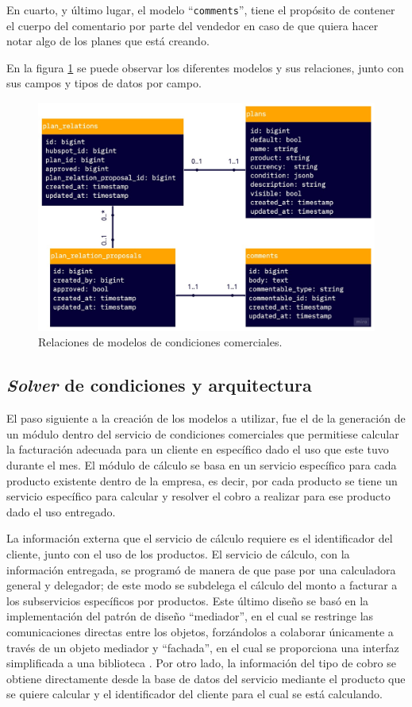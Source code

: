     En cuarto, y último lugar, el modelo ``\texttt{comments}'', tiene el propósito de contener el cuerpo del comentario por parte del vendedor en caso de que quiera hacer notar algo de los planes que está creando.

    En la figura \ref{fig:cc_relations} se puede observar los diferentes modelos y sus relaciones, junto con sus campos y tipos de datos por campo.
    
    \begin{figure}
      \centering
      \includegraphics[width=0.75\linewidth]{figures/cc/cc_relations.jpg}
      \caption{Relaciones de modelos de condiciones comerciales.}
      \label{fig:cc_relations}
    \end{figure}

  \subsection{\textit{Solver} de condiciones y arquitectura}
    \label{solver_y_arquitectura}

    El paso siguiente a la creación de los modelos a utilizar, fue el de la generación de un módulo dentro del servicio de condiciones comerciales  que permitiese calcular la facturación adecuada para un cliente en específico dado el uso que este tuvo durante el mes. El módulo de cálculo se basa en un servicio específico para cada producto existente dentro de la empresa, es decir, por cada producto se tiene un servicio específico para calcular y resolver el cobro a realizar para ese producto dado el uso entregado.

    La información externa que el servicio de cálculo requiere es el identificador del cliente, junto con el uso de los productos. El servicio de cálculo, con la información entregada, se programó de manera de que pase por una calculadora general y delegador; de este modo se subdelega el cálculo del monto a facturar a los subservicios específicos por productos. Este último diseño se basó en la implementación del patrón de diseño ``mediador'', en el cual se restringe las comunicaciones directas entre los objetos, forzándolos a colaborar únicamente a través de un objeto mediador \cite{pattern_mediator} y ``fachada'', en el cual se proporciona una interfaz simplificada a una biblioteca \cite{pattern_facade}. Por otro lado, la información del tipo de cobro se obtiene directamente desde la base de datos del servicio mediante el producto que se quiere calcular y el identificador del cliente para el cual se está calculando.
    
